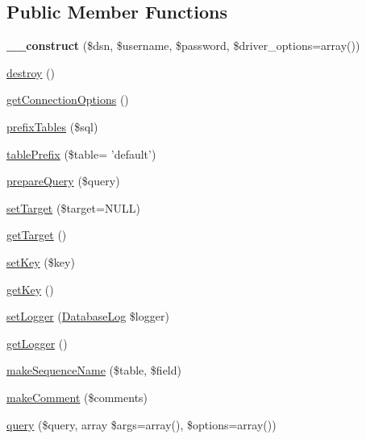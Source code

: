 \subsection*{Public Member Functions}
\begin{DoxyCompactItemize}
\item 
\hypertarget{classDatabaseConnection_ae5f21c56713948d849ff40bc97b53cd9}{
{\bfseries \_\-\_\-construct} (\$dsn, \$username, \$password, \$driver\_\-options=array())}
\label{classDatabaseConnection_ae5f21c56713948d849ff40bc97b53cd9}

\item 
\hyperlink{classDatabaseConnection_a20911bdaaabc2cb0d7af1992ddc96ed5}{destroy} ()
\item 
\hyperlink{classDatabaseConnection_afd8209665716f8866a799ddf2e985d1b}{getConnectionOptions} ()
\item 
\hyperlink{classDatabaseConnection_a10dfbe0177bc8c79a8589cc84afe24dd}{prefixTables} (\$sql)
\item 
\hyperlink{classDatabaseConnection_af9ed26d47fbfce2a25c443c0e73295d7}{tablePrefix} (\$table= 'default')
\item 
\hyperlink{classDatabaseConnection_a3eb8c20adaffdd0f567bbe16d5226554}{prepareQuery} (\$query)
\item 
\hyperlink{classDatabaseConnection_ac4f67f4031517e8c1ee6acfa40427159}{setTarget} (\$target=NULL)
\item 
\hyperlink{classDatabaseConnection_a82dfe273b945f88d173100f0f760efd9}{getTarget} ()
\item 
\hyperlink{classDatabaseConnection_a057f1bce0514e0ce1a555bee7e61930b}{setKey} (\$key)
\item 
\hyperlink{classDatabaseConnection_ad7f059f5a02c65d2d805fe0991982e90}{getKey} ()
\item 
\hyperlink{classDatabaseConnection_aaa0bb7258ae1b10cf8e762bd63c15ac2}{setLogger} (\hyperlink{classDatabaseLog}{DatabaseLog} \$logger)
\item 
\hyperlink{classDatabaseConnection_a9d07ce930cfc948c56fb165494c6b076}{getLogger} ()
\item 
\hyperlink{classDatabaseConnection_a5894f307c1cb799702449f30aa4a092b}{makeSequenceName} (\$table, \$field)
\item 
\hyperlink{classDatabaseConnection_a127563f6bb26ade0aa9480a117be0356}{makeComment} (\$comments)
\item 
\hyperlink{classDatabaseConnection_aff564097281c4496e9d10cb1bccbe98d}{query} (\$query, array \$args=array(), \$options=array())

\end{DoxyCompactItemize}
